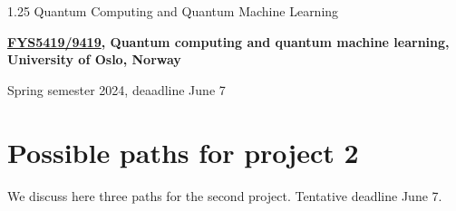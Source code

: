 \documentclass[%
oneside,                 %
final,                   %
10pt]{article}
\begin{document}

\newcommand{\exercisesection}[1]{\subsection*{#1}}






\thispagestyle{empty}

\begin{center}
{\LARGE\bf
\begin{spacing}{1.25}
Quantum Computing and Quantum Machine Learning
\end{spacing}
}
\end{center}


\begin{center}
{\bf \href{{https://www.uio.no/studier/emner/matnat/fys/FYS5419/index-eng.html}}{FYS5419/9419}, Quantum computing and quantum machine learning, University of Oslo, Norway${}^{}$} \\ [0mm]
\end{center}

\begin{center}
\end{center}
    

\begin{center}
Spring semester 2024, deaadline June 7
\end{center}

\vspace{1cm}


\section{Possible paths for project 2}

We discuss here three paths for the second project.
Tentative deadline June 7.
\end{document}
